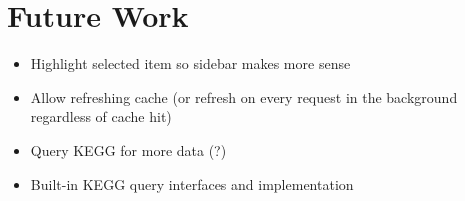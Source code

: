 \section{Future Work}
\label{sect:kegg_future_work}

\begin{itemize}

    \item Highlight selected item so sidebar makes more sense

    \item Allow refreshing cache (or refresh on every request in the background
    regardless of cache hit)

    \item Query KEGG for more data (?)

    \item Built-in KEGG query interfaces and implementation

\end{itemize}
